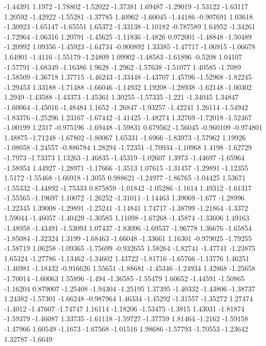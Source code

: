 \documentclass[9pt]{article}
\theoremstyle{plain}
\theoremstyle{definition}
\theoremstyle{remark}
\numberwithin{equation}{section}
\begin{document}
-1.44391
1.1972
-1.78802
-1.52022
-1.37381
1.69487
-1.29019
-1.53122
-1.63117
1.20592
-1.42922
-1.55281
-1.37785
1.40962
-1.60045
-1.44186
-0.907691
1.03618
-1.30923
-1.65147
-1.65551
1.65372
-1.33138
-1.10182
-0.787589
1.64952
-1.34261
-1.72964
-1.06316
1.20791
-1.45625
-1.11836
-1.4826
0.972001
-1.48848
-1.50489
-1.20992
1.09356
-1.45923
-1.64734
-0.900892
1.33385
-1.47717
-1.06915
-1.06678
1.64901
-1.4116
-1.55179
-1.24809
1.09902
-1.48583
-1.61896
-0.5208
1.04107
-1.57791
-1.68349
-1.16386
1.9628
-1.2962
-1.57638
-1.51077
1.40585
-1.7089
-1.58509
-1.36718
1.37715
-1.46243
-1.33448
-1.43707
1.45796
-1.52968
-1.82245
-1.29453
1.33188
-1.71488
-1.66046
-1.14932
1.19208
-1.28938
-1.62148
-1.00302
1.2949
-1.43588
-1.43373
-1.45361
1.30255
-1.57335
-1.221
-1.34045
1.34847
-1.60064
-1.45016
-1.48484
1.1652
-1.26847
-1.93257
-1.42241
1.26114
-1.54942
-1.83376
-1.25296
1.23167
-1.67442
-1.41425
-1.48274
1.32769
-1.72018
-1.52467
-1.00199
1.2317
-0.975196
-1.69448
-1.59831
0.679562
-1.56045
-0.960109
-0.974801
1.48875
-1.71248
-1.67802
-1.80067
1.65331
-1.6966
-1.83973
-1.57962
1.19926
-1.08058
-1.24557
-0.886784
1.28294
-1.72351
-1.70934
-1.10968
1.4198
-1.62729
-1.7973
-1.73373
1.13263
-1.46835
-1.45319
-1.02607
1.3973
-1.44697
-1.65964
-1.58954
1.44927
-1.28971
-1.17666
-1.3513
1.07615
-1.31457
-1.29891
-1.12355
1.5172
-1.55468
-1.66918
-1.3055
0.988621
-1.24977
-1.86765
-1.04425
1.53671
-1.55332
-1.44892
-1.75333
0.875859
-1.01842
-1.05286
-1.1614
1.49312
-1.61317
-1.55565
-1.19697
1.10072
-1.26252
-1.31011
-1.14463
1.39069
-1.677
-1.28996
-1.22345
1.39008
-1.29891
-1.25241
-1.14841
1.74717
-1.38799
-1.21864
-1.3372
1.59044
-1.46057
-1.40429
-1.30585
1.11098
-1.67268
-1.45874
-1.33606
1.49163
-1.48958
-1.43491
-1.53093
1.07437
-1.83096
-1.69537
-1.96778
1.36676
-1.65854
-1.85084
-1.32324
1.3199
-1.68463
-1.66048
-1.33661
1.16301
-0.979025
-1.79255
-1.58719
1.06258
-1.09365
-1.75699
-0.932655
1.58264
-1.82741
-1.47741
-1.23875
1.65324
-1.27786
-1.13462
-1.34602
1.43722
-1.81716
-1.65766
-1.13776
1.46251
-1.46981
-1.18432
-0.916626
1.55651
-1.88681
-1.45346
-1.24934
1.42868
-1.25658
-1.70014
-1.60063
1.55896
-1.494
-1.36585
-1.55479
1.60652
-1.44591
-1.50865
-1.16204
0.879007
-1.25408
-1.94304
-1.25195
1.37395
-1.40332
-1.43806
-1.38737
1.24382
-1.57301
-1.66248
-0.987964
1.46334
-1.45292
-1.31557
-1.35272
1.27474
-1.4012
-1.47607
-1.74747
1.16114
-1.18206
-1.53475
-1.3815
1.43031
-1.81874
-1.59379
-1.46087
1.33735
-1.61118
-1.59727
-1.37759
1.81464
-1.2162
-1.59158
-1.47966
1.60549
-1.1673
-1.67568
-1.01516
1.98686
-1.57793
-1.70553
-1.23642
1.32787
-1.6649
\end{document}
